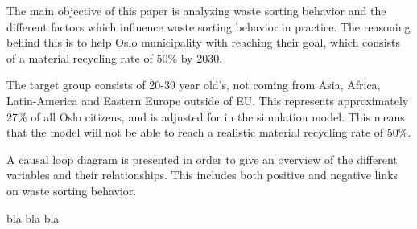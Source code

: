 The main objective of this paper is analyzing waste sorting behavior and the different factors which influence waste sorting behavior in practice. The reasoning behind this is to help Oslo municipality with reaching their goal, which consists of a material recycling rate of 50\% by 2030. 

\indent \newline 
The target group consists of 20-39 year old's, not coming from Asia, Africa, Latin-America and Eastern Europe outside of EU. This represents approximately 27\% of all Oslo citizens, and is adjusted for in the simulation model. This means that the model will not be able to reach a realistic material recycling rate of 50\%.

\indent \newline 
A causal loop diagram is presented in order to give an overview of the different variables and their relationships. This includes both positive and negative links on waste sorting behavior. 

\indent \newline 
bla bla bla
